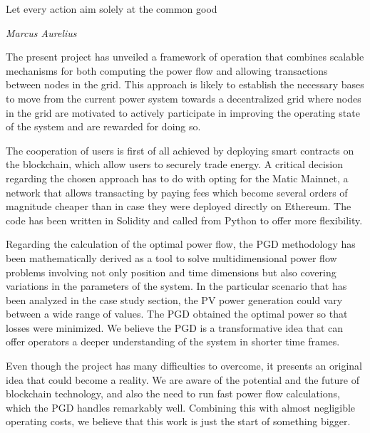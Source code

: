 
\epigraph{Let every action aim solely at the common good}{\textit{Marcus Aurelius}}

The present project has unveiled a framework of operation that combines scalable mechanisms for both computing the power flow and allowing transactions between nodes in the grid. This approach is likely to establish the necessary bases to move from the current power system towards a decentralized grid where nodes in the grid are motivated to actively participate in improving the operating state of the system and are rewarded for doing so. 

The cooperation of users is first of all achieved by deploying smart contracts on the blockchain, which allow users to securely trade energy. A critical decision regarding the chosen approach has to do with opting for the Matic Mainnet, a network that allows transacting by paying fees which become several orders of magnitude cheaper than in case they were deployed directly on Ethereum. The code has been written in Solidity and called from Python to offer more flexibility.

Regarding the calculation of the optimal power flow, the PGD methodology has been mathematically derived as a tool to solve multidimensional power flow problems involving not only position and time dimensions but also covering variations in the parameters of the system. In the particular scenario that has been analyzed in the case study section, the PV power generation could vary between a wide range of values. The PGD obtained the optimal power so that losses were minimized. We believe the PGD is a transformative idea that can offer operators a deeper understanding of the system in shorter time frames.

Even though the project has many difficulties to overcome, it presents an original idea that could become a reality. We are aware of the potential and the future of blockchain technology, and also the need to run fast power flow calculations, which the PGD handles remarkably well. Combining this with almost negligible operating costs, we believe that this work is just the start of something bigger.



